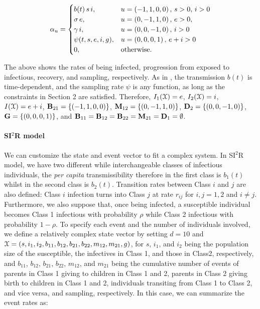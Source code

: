 \documentclass[11pt,reqno,final]{amsart}\usepackage[]{graphicx}\usepackage[]{color}
\begin{document}
\begin{equation*}
  \alpha_u =
  \begin{cases}
     b(t)\,s\,i, & u=\left(-1,1,0,0\right),\,s>0,\,i>0 \\
    \sigma\,e, & u=\left(0,-1,1,0\right),\,e>0,\\
    \gamma\,i, & u=\left(0,0,-1,0\right),\,i>0\\
    \psi(t,s,e,i,g), & u=\left(0,0,0,1\right),\, e+i>0\\
    0, & \text{otherwise.}
  \end{cases}
\end{equation*}

The above shows the rates of being infected, progression from exposed to infectious, recovery, and sampling, respectively. As in \citet{King2021}, the transmission $b(t)$ is time-dependent, and the sampling rate $\psi$ is any function, as long as the constraints in Section 2 are satisfied. Therefore, $I_1(\mathcal{X})=e$, $I_2(\mathcal{X})=i$, $I(\mathcal{X})=e+i$, $\mathbf{B}_{21}=\{\left(-1,1,0,0\right)\}$, $\mathbf{M}_{12}=\{\left(0,-1,1,0\right)\}$, $\mathbf{D}_2=\{\left(0,0,-1,0\right)\}$, $\mathbf{G}=\{\left(0,0,0,1\right)\}$, and $\mathbf{B}_{11}=\mathbf{B}_{12}=\mathbf{B}_{22}=\mathbf{M}_{21}=\mathbf{D}_1=\emptyset$.

\paragraph{SI$^2$R model}

We can customize the state and event vector to fit a complex system. In SI$^2$R model, we have two different while interchangeable classes of infectious individuals, the \emph{per capita} transmissibility therefore in the first class is $b_1(t)$ whilst in the second class is $b_2(t)$. Transition rates between Class $i$ and $j$ are also defined: Class $i$ infection turns into Class $j$ at rate $r_{ij}$ for $i,j=1,2$ and $i\neq j$. Furthermore, we also suppose that, once being infected, a susceptible individual becomes Class 1 infectious with probability $\rho$ while Class 2 infectious with probability $1-\rho$. To specify each event and the number of individuals involved, we define a relatively complex state vector by setting $d=10$ and $\mathcal{X}=\left(s,i_1,i_2,b_{11},b_{12},b_{21},b_{22},m_{12},m_{21},g\right)$, for $s$, $i_1$, and $i_2$ being the population size of the susceptible, the infectives in Class 1, and those in Class2, respectively, and $b_{11}$, $b_{12}$, $b_{21}$, $b_{22}$, $m_{12}$, and $m_{21}$ being the cumulative number of events of parents in Class 1 giving to children in Class 1 and 2, parents in Class 2 giving birth to children in Class 1 and 2, individuals transiting from Class 1 to Class 2, and vice versa, and sampling, respectively. In this case, we can summarize the event rates as:
\end{document}

